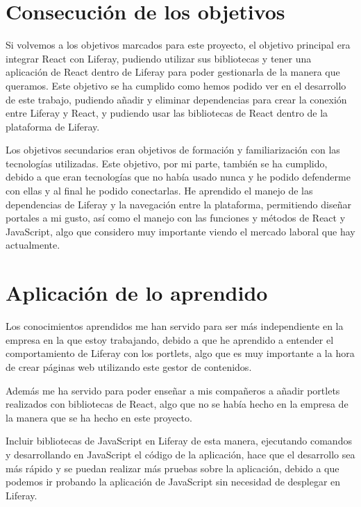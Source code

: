 \documentclass[a4paper, 12pt]{book}
\begin{document}
\section{Consecución de los objetivos}
\label{sec:consecucion_objectivos}
Si volvemos a los objetivos marcados para este proyecto, el objetivo principal era integrar React con Liferay, pudiendo utilizar sus bibliotecas y tener una aplicación de React dentro de Liferay para poder gestionarla de la manera que queramos. Este objetivo se ha cumplido como hemos podido ver en el desarrollo de este trabajo, pudiendo añadir y eliminar dependencias para crear la conexión entre Liferay y React, y pudiendo usar las bibliotecas de React dentro de la plataforma de Liferay.

\vspace{5mm}
Los objetivos secundarios eran objetivos de formación y familiarización con las tecnologías utilizadas. Este objetivo, por mi parte, también se ha cumplido, debido a que eran tecnologías que no había usado nunca y he podido defenderme con ellas y al final he podido conectarlas. He aprendido el manejo de las dependencias de Liferay y la navegación entre la plataforma, permitiendo diseñar portales a mi gusto, así como el manejo con las funciones y métodos de React y JavaScript, algo que considero muy importante viendo el mercado laboral que hay actualmente.

\section{Aplicación de lo aprendido}
\label{sec:aprendido}
Los conocimientos aprendidos me han servido para ser más independiente en la empresa en la que estoy trabajando, debido a que he aprendido a entender el comportamiento de Liferay con los portlets, algo que es muy importante a la hora de crear páginas web utilizando este gestor de contenidos.

\vspace{5mm}
Además me ha servido para poder enseñar a mis compañeros a añadir portlets realizados con bibliotecas de React, algo que no se había hecho en la empresa de la manera que se ha hecho en este proyecto. 

Incluir bibliotecas de JavaScript en Liferay de esta manera, ejecutando comandos y desarrollando en JavaScript el código de la aplicación, hace que el desarrollo sea más rápido y se puedan realizar más pruebas sobre la aplicación, debido a que podemos ir probando la aplicación de JavaScript sin necesidad de desplegar en Liferay.
\end{document}
